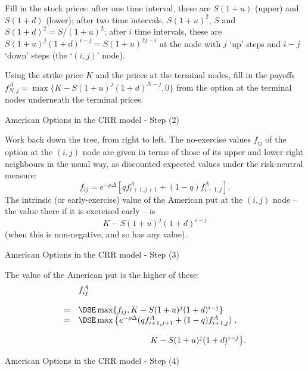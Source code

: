 	Fill in the stock prices: after one time interval, these are
$S(1+u)$ (upper) and $S(1+d)$ (lower); after two time intervals,
$S(1+u)^2$, $S$ and $ S(1+d)^2 = S/(1+u)^2$; after $i$ time
intervals, these are $S(1+u)^j (1+d)^{i-j} = S (1+u)^{2j- i}$ at
the node with
$j$ `up' steps and $i-j$ `down' steps (the `$(i,j)$' node).


	Using the strike price $K$ and the prices at the terminal
nodes, fill in the payoffs $f^A_{N,j} = \max\{K - S (1+u)^j
(1+d)^{N-j}, 0\}$ from the option
at the terminal nodes underneath the terminal prices.





{American Options in the CRR model - Step (2)}




\setcounter{enumi}{3}


	Work back down the tree, from right to left. The no-exercise
values $f_{ij}$ of the option at the $(i,j)$ node are given in
terms of those of its upper and lower right neighbours in the
usual way, as discounted expected values under the risk-neutral
measure:
$$
f_{ij} = e^{-\rho \Delta } [q f^A_{i+1,j+1} + (1 - q)
f^A_{i+1,j}].
$$
The intrinsic (or early-exercise) value of the American put at the
$(i,j)$
 node -- the value there if it is exercised early -- is
$$
K - S (1+u)^j (1+d)^{i-j}
$$
(when this is non-negative, and so has any value).





{American Options in the CRR model - Step (3)}






	The value of
the American put is the higher of these:
$$
\begin{array}{ll}
&f^A_{ij} \\*[12pt]=&\DSE \max\{f_{ij}, K - S (1+u)^j (1+d)^{i-j}\}\\
=&\DSE \max\left\{e^{-\rho \Delta} (q f^A_{i+1,j+1} + (1 - q)
f^A_{i+1,j})\right.,\\*[12pt]
&\hspace{3cm} \left. K - S (1+u)^j (1+d)^{i-j}\right\}\!.
\end{array}
$$





{American Options in the CRR model - Step (4)}


